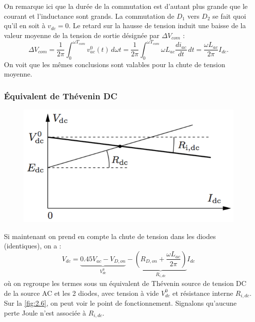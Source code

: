 			On remarque ici que la durée de la commutation est d'autant plus grande que le courant et l'inductance sont grands. La commutation de $D_1$ vers $D_2$ se fait quoi qu'il en soit à $v_{dc} = 0$. Le retard sur la hausse de tension induit une baisse de la valeur moyenne de la tension de sortie désignée par $\Delta V_{com}$ : 			
			\begin{equation}
				\Delta V_{com} = \frac{1}{2\pi} \int _0 ^{\omega T_{com}} v_{ac}^0(t) \, d\omega t = \frac{1}{2\pi} \int _0 ^{\omega T_{com}} \omega L_{ac}\frac{di_{ac}}{dt} \, dt = \frac{\omega L_{ac}}{2\pi} I_{dc}.
 			\end{equation}
 			On voit que les mêmes conclusions sont valables pour la chute de tension moyenne.  
 
 		\subsubsection{Équivalent de Thévenin DC}
 			
			\begin{figure}
			\vspace{-5mm}
			\includegraphics[scale=0.4]{ch2/7}
			\label{fig:2.6}
			\end{figure} 			
 			Si maintenant on prend en compte la chute de tension dans les diodes (identiques), on a : 
 			\begin{equation}
 				V_{dc} = \underbrace{0.45 V_{ac} - V_{D,on}}_{V_{dc}^0} - \underbrace{(R_{D,on}+\frac{\omega L_{ac}}{2\pi})}_{R_{i,dc}} I_{dc}
			\end{equation} 			 
			où on regroupe les termes sous un équivalent de Thévenin source de tension DC de la source AC et les 2 diodes, avec tension à vide $V_{dc}^0$ et résistance interne $R_{i,dc}$. Sur la \autoref{fig:2.6}, on peut voir le point de fonctionnement. Signalons qu'aucune perte Joule n'est associée à $R_{i,dc}$. 
			
